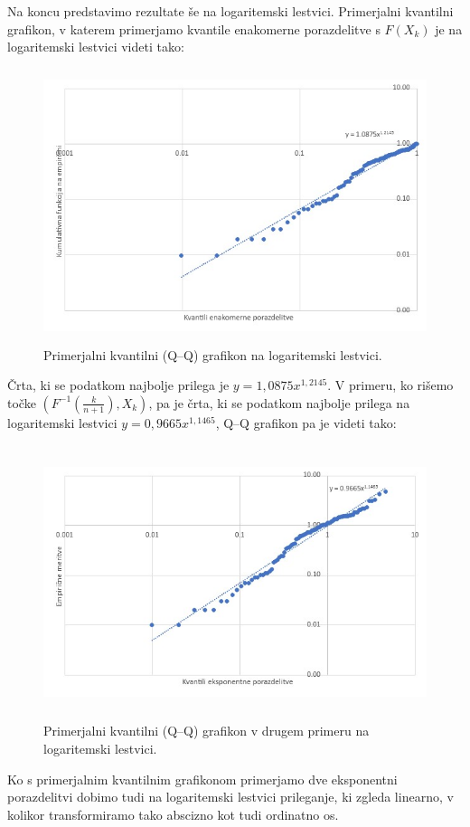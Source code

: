 \documentclass{article}
\begin{document}
Na koncu predstavimo rezultate še na logaritemski lestvici. Primerjalni kvantilni grafikon, v katerem primerjamo 
kvantile enakomerne porazdelitve s $F(X_k)$ je na logaritemski lestvici videti tako:
\begin{figure}[H]
    \centering
    \includegraphics[height=8cm]{qq1log.jpg}
    \caption{Primerjalni kvantilni (Q--Q) grafikon na logaritemski lestvici.}
\end{figure}
Črta, ki se podatkom najbolje prilega je $y = 1{,}0875 x^{1{,}2145}$. V primeru, ko rišemo točke
$ \left( F^{-1} \left( \frac{k}{n+1}\right), X_k \right) $, pa je črta, ki se podatkom najbolje prilega 
na logaritemski lestvici $y = 0{,}9665 x^{1{,}1465}$, Q--Q grafikon pa je videti tako:
\begin{figure}[H]
    \centering
    \includegraphics[height=8cm]{qq2log.jpg}
    \caption{Primerjalni kvantilni (Q--Q) grafikon v drugem primeru na logaritemski lestvici.}
\end{figure}

Ko s primerjalnim kvantilnim grafikonom primerjamo dve eksponentni porazdelitvi dobimo tudi na logaritemski
lestvici prileganje, ki zgleda linearno, v kolikor transformiramo tako abscizno kot tudi ordinatno os.
\end{document}
